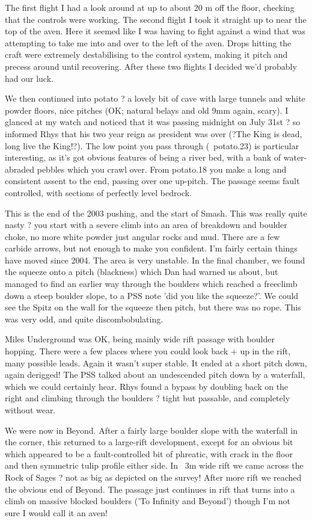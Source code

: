 \documentclass[onecolumn]{book}
\begin{document}
The first flight I had a look around at up to about 20 m off the floor, checking that the controls were working. The second flight I took it straight up to near the top of the aven. Here it seemed like I was having to fight against a wind that was attempting to take me into and over to the left of the aven. Drops hitting the craft were extremely destabilising to the control system, making it pitch and precess around until recovering. After these two flights I decided we'd probably had our luck.

We then continued into potato ? a lovely bit of cave with large tunnels and white powder floors, nice pitches (OK; natural belays and old 9mm again, scary). I glanced at my watch and noticed that it was passing midnight on July 31st ? so informed Rhys that his two year reign as president was over (?The King is dead, long live the King!?).
The low point you pass through (~potato.23) is particular interesting, as it's got obvious features of being a river bed, with a bank of water-abraded pebbles which you crawl over.
From potato.18 you make a long and consistent assent to the end, passing over one up-pitch. The passage seems fault controlled, with sections of perfectly level bedrock.


This is the end of the 2003 pushing, and the start of Smash. This was really quite nasty ? you start with a severe climb into an area of breakdown and boulder choke, no more white powder just angular rocks and mud. There are a few carbide arrows, but not enough to make you confident. I'm fairly certain things have moved since 2004. The area is very unstable. In the final chamber, we found the squeeze onto a pitch (blackness) which Dan had warned us about, but managed to find an earlier way through the boulders which reached a freeclimb down a steep boulder slope, to a PSS note 'did you like the squeeze?'. We could see the Spitz on the wall for the squeeze then pitch, but there was no rope. This was very odd, and quite discombobulating.

Miles Underground was OK, being mainly wide rift passage with boulder hopping. There were a few places where you could look back + up in the rift, many possible leads. Again it wasn't super stable. It ended at a short pitch down, again derigged! The PSS talked about an undescended pitch down by a waterfall, which we could certainly hear.
Rhys found a bypass by doubling back on the right and climbing through the boulders ? tight but passable, and completely without wear.

We were now in Beyond. After a fairly large boulder slope with the waterfall in the corner, this returned to a large-rift development, except for an obvious bit which appeared to be a fault-controlled bit of phreatic, with crack in the floor and then symmetric tulip profile either side. In ~3m wide rift we came across the Rock of Sages ? not as big as depicted on the survey!
After more rift we reached the obvious end of Beyond. The passage just continues in rift that turns into a climb on massive blocked boulders ('To Infinity and Beyond') though I'm not sure I would call it an aven!
\end{document}

